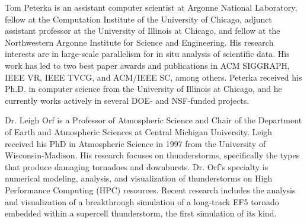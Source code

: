 Tom Peterka is an assistant computer scientist at Argonne National Laboratory, fellow at the Computation Institute of the University of Chicago, adjunct assistant professor at the University of Illinois at Chicago, and fellow at the Northwestern Argonne Institute for Science and Engineering. His research interests are in large-scale parallelism for in situ analysis of scientific data. His work has led to two best paper awards and publications in ACM SIGGRAPH, IEEE VR, IEEE TVCG, and ACM/IEEE SC, among others. Peterka received his Ph.D. in computer science from the University of Illinois at Chicago, and he currently works actively in several DOE- and NSF-funded projects.

Dr. Leigh Orf is a Professor of Atmospheric Science and Chair of the Department of Earth and Atmospheric Sciences at Central Michigan University. Leigh received his PhD in Atmospheric Science in 1997 from the University of Wisconsin-Madison. His research focuses on thunderstorms, specifically the types that produce damaging tornadoes and downbursts. Dr. Orf’s specialty is numerical modeling, analysis, and visualization of thunderstorms on High Performance Computing (HPC) resources. Recent research includes the analysis and visualization of a breakthrough simulation of a long-track EF5 tornado embedded within a supercell thunderstorm, the first simulation of its kind.



